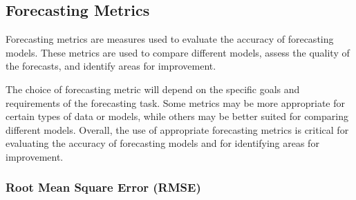 

  
  \subsection{Forecasting Metrics}
  \label{sec:forecasting-metrics-evaluation-setup}

    Forecasting metrics \cite{botchkarevPerformanceMetricsError2018} are measures used to evaluate the accuracy of forecasting models. These metrics are used to compare different models, assess the quality of the forecasts, and identify areas for improvement.





    The choice of forecasting metric will depend on the specific goals and requirements of the forecasting task. Some metrics may be more appropriate for certain types of data or models, while others may be better suited for comparing different models.
    Overall, the use of appropriate forecasting metrics is critical for evaluating the accuracy of forecasting models and for identifying areas for improvement.

    \subsubsection{Root Mean Square Error (RMSE)}
    \label{sec:rmse-metrics-evaluation}

